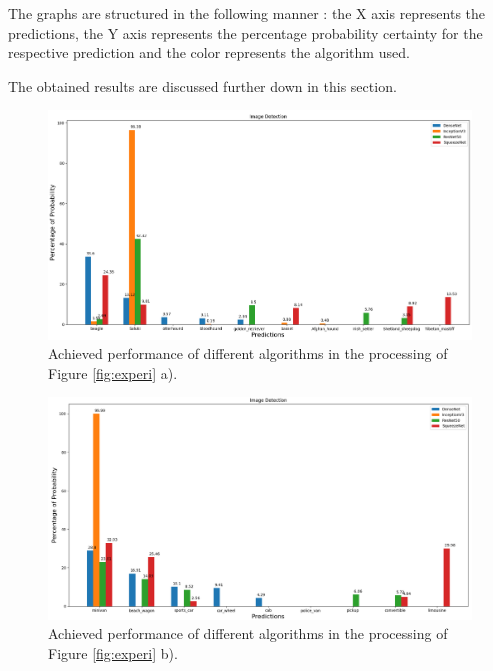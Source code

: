 The graphs are structured in the following manner : the X axis represents the predictions, the Y axis represents the percentage probability certainty for the respective prediction and the color represents the algorithm used.

The obtained results are discussed further down in this section.

\begin{figure}[H]
  \centering
  \captionsetup{justification=centering}
  \includegraphics[width=\textwidth]{Sections/4InitialWork/4_images/run1_res.png}
  \caption[Achieved performance of different algorithms]{Achieved performance of different algorithms in the processing of Figure \ref{fig:experi} a).} 
  \label{fig:exp1}
\end{figure}



\begin{figure}[H]
  \centering
  \includegraphics[width=\textwidth]{Sections/4InitialWork/4_images/run3_res.png}
  \caption[Achieved performance of different algorithms]{Achieved performance of different algorithms in the processing of Figure \ref{fig:experi} b).}
  \label{fig:exp2}
\end{figure}




